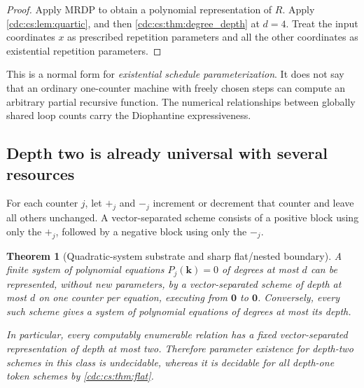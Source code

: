 \documentclass[11pt,a4paper]{article}
\newtheorem{theorem}{Theorem}[section]
\theoremstyle{definition}
\theoremstyle{remark}
\newcommand{\zeros}{\boldsymbol{0}}
\begin{document}
\begin{proof}
Apply MRDP to obtain a polynomial representation of $R$. Apply
\cref{cdc:cs:lem:quartic}, and then \cref{cdc:cs:thm:degree_depth} at $d=4$. Treat the input
coordinates $x$ as prescribed repetition parameters and all the other
coordinates as existential repetition parameters.
\end{proof}

This is a normal form for \emph{existential schedule parameterization}. It
does not say that an ordinary one-counter machine with freely chosen steps
can compute an arbitrary partial recursive function. The numerical
relationships between globally shared loop counts carry the Diophantine
expressiveness.

\subsection{Depth two is already universal with several resources}

For each counter $j$, let $+_j$ and $-_j$ increment or decrement that counter
and leave all others unchanged. A vector-separated scheme consists of a
positive block using only the $+_j$, followed by a negative block using only
the $-_j$.

\begin{theorem}[Quadratic-system substrate and sharp flat/nested boundary]
\label{cdc:cs:thm:depthtwo}
A finite system of polynomial equations $P_j(\mathbf{k})=0$ of degrees at
most $d$ can be represented, without new parameters, by a vector-separated
scheme of depth at most $d$ on one counter per equation, executing from
$\zeros$ to $\zeros$. Conversely, every such scheme gives a system of
polynomial equations of degrees at most its depth.

In particular, every computably enumerable relation has a fixed
vector-separated representation of depth at most two. Therefore parameter
existence for depth-two schemes in this class is undecidable, whereas it is
decidable for all depth-one token schemes by \cref{cdc:cs:thm:flat}.
\end{theorem}
\end{document}
